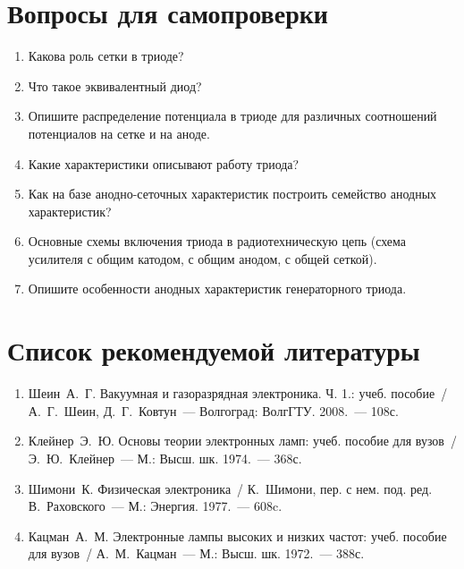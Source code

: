 \section*{Вопросы для самопроверки}
\vspace{-1.5em}
\renewcommand{\labelenumi}{\arabic{enumi}.}
\begin{enumerate}
  \singlespacing
  \itemsep -.5pt
  \item Какова роль сетки в триоде?
  \item Что такое эквивалентный диод?
  \item Опишите распределение потенциала в триоде для различных соотношений
    потенциалов на сетке и на аноде.
  \item Какие характеристики описывают работу триода?
  \item Как на базе анодно-сеточных характеристик построить семейство
    анодных характеристик?
  \item Основные схемы включения триода в радиотехническую цепь (схема
    усилителя с общим катодом, с общим анодом, с общей сеткой).
  \item Опишите особенности анодных характеристик генераторного триода.
\end{enumerate}

\section*{Список рекомендуемой литературы}
\vspace{-1.5em}
\begin{enumerate}
  \singlespacing
  \itemsep -.5pt
  \item Шеин~А.~Г. Вакуумная и газоразрядная электроника. Ч. 1.: учеб.
  пособие~/ А.~Г.~Шеин, Д.~Г.~Ковтун~--- Волгоград: ВолгГТУ. 2008.~--- 108с.
  \item Клейнер~Э.~Ю. Основы теории электронных ламп: учеб. пособие для
  вузов~/ Э.~Ю.~Клейнер~--- М.: Высш. шк. 1974.~--- 368с.
  \item Шимони~К. Физическая электроника~/ К.~Шимони, пер. с нем. под. ред.
  В.~Раховского~--- М.: Энергия. 1977.~--- 608c.
  \item Кацман~А.~М. Электронные лампы высоких и низких частот: учеб. пособие
  для вузов~/ А.~М.~Кацман~--- М.: Высш. шк. 1972.~--- 388с.
\end{enumerate}